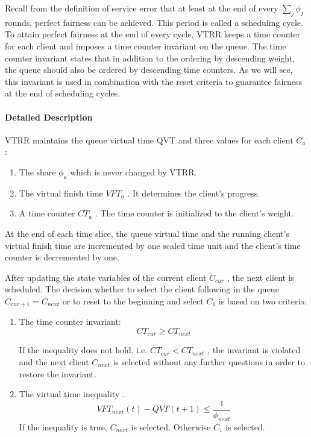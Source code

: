 Recall from the definition of service error that at least at the end of every
$\sum_j\phi_j$   rounds, perfect fairness can be achieved. This period is called a scheduling cycle.
To attain perfect fairness at the end of every cycle, VTRR keeps a time counter for
each client and imposes a time counter invariant on the queue. The time counter invariant
states that in addition to the ordering by descending weight, the queue should also be
ordered by descending time counters. As we will see, this invariant is used in combination
with the reset criteria to guarantee fairness at the end of scheduling cycles.

\paragraph{Detailed Description}

VTRR maintains the queue virtual time QVT and three values for each client $C_a$ :

\begin{enumerate}                           
    \item The share $\phi_a$ which is never changed by VTRR.
    \item The virtual finish time $VFT_a$ . It determines the client’s progress.
    \item A time counter $CT_a$ . The time counter is initialized to the client’s weight.
\end{enumerate}

At the end of each time slice, the queue virtual time and the running client’s virtual finish
time are incremented by one scaled time unit and the client’s time counter is decremented
by one.

After updating the state variables of the current client $C_{cur}$ , the next client is scheduled.
The decision whether to select the client following in the queue $C_{cur+1} = C_{next}$ or to
reset to the beginning and select $C_1$ is based on two criteria:
                    
\begin{enumerate}                           
\item The time counter invariant:
  \begin{equation}
    CT_{cur} \ge CT_{next}
  \end{equation}
          
      If the inequality does not hold, i.e. $CT_{cur} < CT_{next}$ , the invariant is violated and
      the next client $C_{next}$ is selected without any further questions in order to restore the
      invariant.

   \item The virtual time inequality .
     \begin{equation}
      VFT_{next}(t) - QVT(t + 1) \le \frac{1}{\phi_{next}}
     \end{equation}                             
     If the inequality is true, $C_{next}$ is selected. Otherwise $C_1$ is selected.
\end{enumerate}

